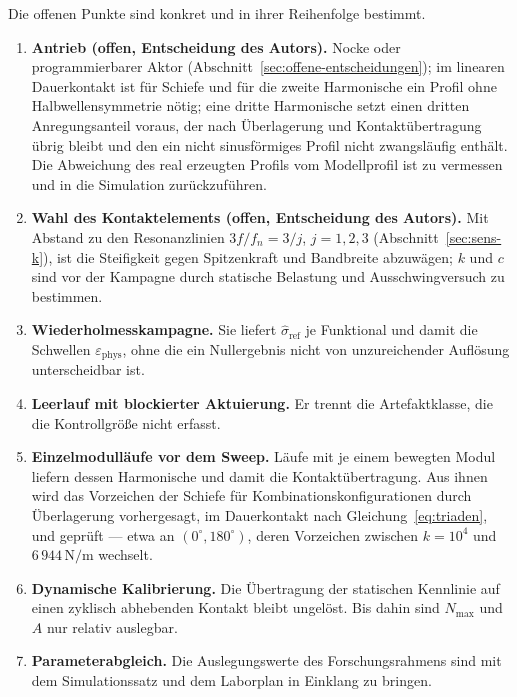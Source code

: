 \documentclass[12pt,a4paper]{report}
\begin{document}
Die offenen Punkte sind konkret und in ihrer Reihenfolge bestimmt.

\begin{enumerate}
\item \textbf{Antrieb (offen, Entscheidung des Autors).} Nocke oder
      programmierbarer Aktor (Abschnitt~\ref{sec:offene-entscheidungen});
      im linearen Dauerkontakt ist für Schiefe und für die zweite
      Harmonische ein Profil ohne Halbwellensymmetrie nötig; eine dritte
      Harmonische setzt einen dritten Anregungsanteil voraus, der nach
      Überlagerung und Kontaktübertragung übrig bleibt und den ein nicht
      sinusförmiges Profil nicht zwangsläufig enthält. Die
      Abweichung des real erzeugten Profils vom Modellprofil ist zu
      vermessen und in die Simulation zurückzuführen.
\item \textbf{Wahl des Kontaktelements (offen, Entscheidung des Autors).} Mit Abstand zu den
      Resonanzlinien $3f/f_n = 3/j$, $j = 1, 2, 3$
      (Abschnitt~\ref{sec:sens-k}), ist die Steifigkeit gegen
      Spitzenkraft und Bandbreite abzuwägen; $k$ und $c$ sind vor der
      Kampagne durch statische Belastung und Ausschwingversuch zu
      bestimmen.
\item \textbf{Wiederholmesskampagne.} Sie liefert
      $\hat{\sigma}_{\mathrm{ref}}$ je Funktional und damit die
      Schwellen $\varepsilon_{\mathrm{phys}}$, ohne die ein Nullergebnis
      nicht von unzureichender Auflösung unterscheidbar ist.
\item \textbf{Leerlauf mit blockierter Aktuierung.} Er trennt die
      Artefaktklasse, die die Kontrollgröße nicht erfasst.
\item \textbf{Einzelmodulläufe vor dem Sweep.} Läufe mit je einem
      bewegten Modul liefern dessen Harmonische und damit die
      Kontaktübertragung. Aus ihnen wird das Vorzeichen der Schiefe für
      Kombinationskonfigurationen durch Überlagerung vorhergesagt, im
      Dauerkontakt nach Gleichung~\eqref{eq:triaden}, und geprüft ---
      etwa an $(0^\circ, 180^\circ)$, deren Vorzeichen zwischen
      $k = 10^{4}$ und $6\,944\,\mathrm{N/m}$ wechselt.
\item \textbf{Dynamische Kalibrierung.} Die Übertragung der statischen
      Kennlinie auf einen zyklisch abhebenden Kontakt bleibt ungelöst.
      Bis dahin sind $N_{\max}$ und $A$ nur relativ auslegbar.
\item \textbf{Parameterabgleich.} Die Auslegungswerte des
      Forschungsrahmens sind mit dem Simulationssatz und dem Laborplan
      in Einklang zu bringen.
\end{enumerate}
\end{document}
